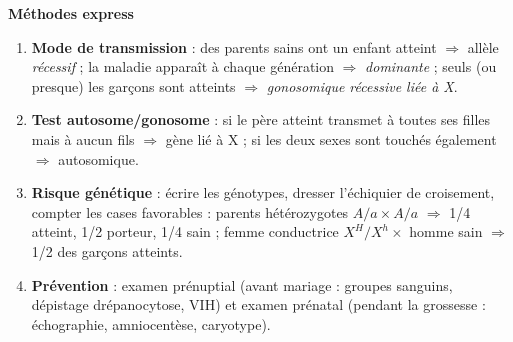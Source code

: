 \documentclass[11pt]{article}
\newcommand{\cle}[1]{{\popxbold\color{popdark}#1}}
\begin{document}
\begin{bilan}
\textbf{Méthodes express}
\begin{enumerate}
  \item \textbf{Mode de transmission} : des parents sains ont un enfant atteint $\Rightarrow$ allèle \emph{récessif} ; la maladie apparaît à chaque génération $\Rightarrow$ \emph{dominante} ; seuls (ou presque) les garçons sont atteints $\Rightarrow$ \emph{gonosomique récessive liée à X}.
  \item \textbf{Test autosome/gonosome} : si le père atteint transmet à toutes ses filles mais à aucun fils $\Rightarrow$ gène lié à X ; si les deux sexes sont touchés également $\Rightarrow$ autosomique.
  \item \textbf{Risque génétique} : écrire les génotypes, dresser l'échiquier de croisement, compter les cases favorables : parents hétérozygotes $A/a \times A/a$ $\Rightarrow$ 1/4 atteint, 1/2 porteur, 1/4 sain ; femme conductrice $X^H/X^h \times$ homme sain $\Rightarrow$ 1/2 des garçons atteints.
  \item \textbf{Prévention} : examen \cle{prénuptial} (avant mariage : groupes sanguins, dépistage drépanocytose, VIH) et examen \cle{prénatal} (pendant la grossesse : échographie, amniocentèse, caryotype).
\end{enumerate}
\end{bilan}
\end{document}
